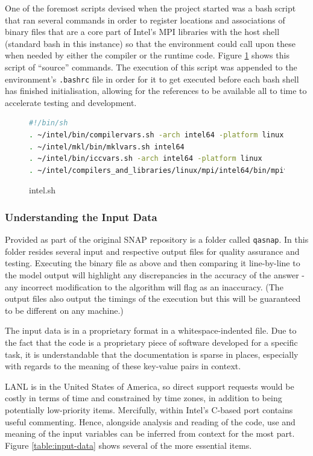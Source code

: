 \documentclass[conference]{IEEEtran}
\begin{document}
One of the foremost scripts devised when the project started was a bash script that ran several commands in order to register locations and associations of binary files that are a core part of Intel's MPI libraries with the host shell (standard bash in this instance) so that the environment could call upon these when needed by either the compiler or the runtime code. Figure \ref{fig:source_list} shows this script of ``source'' commands. The execution of this script was appended to the environment's \texttt{.bashrc} file in order for it to get executed before each bash shell has finished initialisation, allowing for the references to be available all to time to accelerate testing and development.

\begin{figure}[h]
    \centering
    \begin{lstlisting}[language=bash, breaklines]
#!/bin/sh
. ~/intel/bin/compilervars.sh -arch intel64 -platform linux
. ~/intel/mkl/bin/mklvars.sh intel64
. ~/intel/bin/iccvars.sh -arch intel64 -platform linux
. ~/intel/compilers_and_libraries/linux/mpi/intel64/bin/mpivars.sh 
    \end{lstlisting}
    \caption{intel.sh}
    \label{fig:source_list}
\end{figure}



\subsubsection{Understanding the Input Data}

Provided as part of the original SNAP repository is a folder called \texttt{qasnap}. In this folder resides several input and respective output files for quality assurance and testing. Executing the binary file as above and then comparing it line-by-line to the model output will highlight any discrepancies in the accuracy of the answer - any incorrect modification to the algorithm will flag as an inaccuracy. (The output files also output the timings of the execution but this will be guaranteed to be different on any machine.)

The input data is in a proprietary format in a whitespace-indented file. Due to the fact that the code is a proprietary piece of software developed for a specific task, it is understandable that the documentation is sparse in places, especially with regards to the meaning of these key-value pairs in context.

LANL is in the United States of America, so direct support requests would be costly in terms of time and constrained by time zones, in addition to being potentially low-priority items. Mercifully, within Intel's C-based port contains useful commenting. Hence, alongside analysis and reading of the code, use and meaning of the input variables can be inferred from context for the most part. Figure \ref{table:input-data} shows several of the more essential items. 
\end{document}
